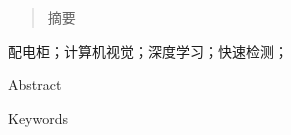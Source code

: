 \begin{abstract}
   摘要
\end{abstract}

\begin{keywords}
配电柜；计算机视觉；深度学习；快速检测；
\end{keywords}

\begin{englishabstract}
   Abstract
\end{englishabstract}

\begin{englishkeywords}
   Keywords
\end{englishkeywords}

\cleardoublepage